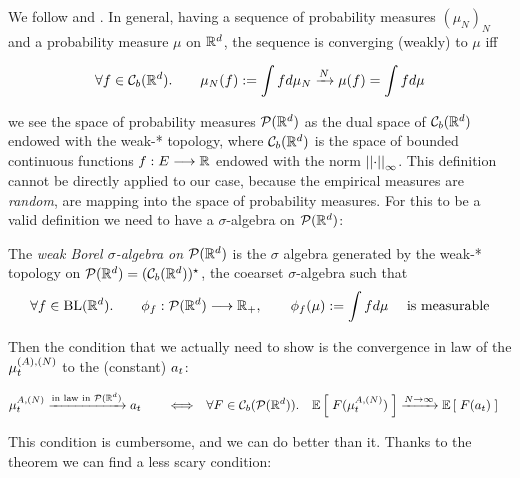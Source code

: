 We follow \cite[Section 11.4]{dudley} and \cite[Part 1, Ch. 6]{cedric-villani-opt-trans}.
In general, having a sequence of probability measures $(\mu_N)_N$ and a probability measure $\mu$ on $\mathbb{R}^d$, the sequence is converging (weakly) to $\mu$ iff

\begin{equation*}
	\forall f \in \mathcal{C}_b(\mathbb{R}^d). \qquad \mu_N(f) := \int f d\mu_N \xrightarrow{N} \mu(f) = \int f d\mu
\end{equation*}

\ie we see the space of probability measures $\mathcal{P}(\mathbb{R}^d)$ as the dual space of $\mathcal{C}_b(\mathbb{R}^d)$ endowed with the weak-* topology, where $\mathcal{C}_b(\mathbb{R}^d)$ is the space of bounded continuous functions $f:E \longrightarrow \mathbb{R}$ endowed with the norm ${ \left| \left| \cdot \right| \right|_{\infty} }$.
This definition cannot be directly applied to our case, because the empirical measures are \emph{random}, \ie are \rv mapping into the space of probability measures.
For this to be a valid definition we need to have a $\sigma$-algebra on $\mathcal{P}(\mathbb{R}^d)$:

\begin{definition}
	The \emph{weak Borel $\sigma$-algebra on $\mathcal{P}(\mathbb{R}^d)$} is the $\sigma$ algebra generated by the weak-* topology on $\mathcal{P}(\mathbb{R}^d) = (\mathcal{C}_b(\mathbb{R}^d))^\star$, \ie the coearset $\sigma$-algebra such that
		\begin{equation*}
			\forall f \in {\text{BL}}(\mathbb{R}^d).\qquad
			\phi_f: \mathcal{P}(\mathbb{R}^d) \longrightarrow \mathbb{R}_+, \qquad
			\phi_f(\mu) := \int f d\mu\quad
			\text{ is measurable}
		\end{equation*}
\end{definition}

Then the condition that we actually need to show is the convergence in law of the \rv $\mu_t^{(A),(N)}$ to the (constant) \rv $a_t$:

\begin{equation}\label{ch3:cumbersome-condition-convergence-in-Pspace}
	\begin{aligned}
	\mu_t^{A,(N)}\xrightarrow{\text{in law in $\mathcal{P}(\mathbb{R}^d)$}} a_t
	\qquad \Longleftrightarrow
	\quad
	&\forall F\in \mathcal{C}_b(\mathcal{P}(\mathbb{R}^d)).\quad
	\mathbb{E} \left[ \; F(\mu_t^{A,(N)}) \; \right]
	\xrightarrow{N \rightarrow \infty} 
	\mathbb{E} \left[ \; F(a_t) \; \right]
	\end{aligned}
\end{equation}

This condition is cumbersome, and we can do better than it.
Thanks to the theorem \cite[Proposition 2.2]{sznitman} we can find a less scary condition:

